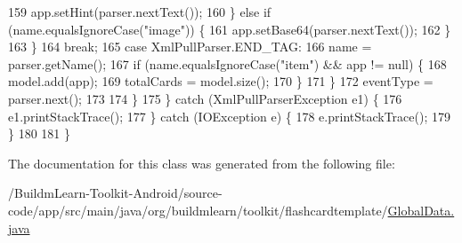 \begin{DoxyCode}
159                                 app.setHint(parser.nextText());
160                             \} \textcolor{keywordflow}{else} \textcolor{keywordflow}{if} (name.equalsIgnoreCase(\textcolor{stringliteral}{"image"})) \{
161                                 app.setBase64(parser.nextText());
162                             \}
163                         \}
164                         \textcolor{keywordflow}{break};
165                     \textcolor{keywordflow}{case} XmlPullParser.END\_TAG:
166                         name = parser.getName();
167                         \textcolor{keywordflow}{if} (name.equalsIgnoreCase(\textcolor{stringliteral}{"item"}) && app != null) \{
168                             model.add(app);
169                             totalCards = model.size();
170                         \}
171                 \}
172                 eventType = parser.next();
173 
174             \}
175         \} \textcolor{keywordflow}{catch} (XmlPullParserException e1) \{
176             e1.printStackTrace();
177         \} \textcolor{keywordflow}{catch} (IOException e) \{
178             e.printStackTrace();
179         \}
180 
181     \}
\end{DoxyCode}


The documentation for this class was generated from the following file\-:\begin{DoxyCompactItemize}
\item 
/\-Buildm\-Learn-\/\-Toolkit-\/\-Android/source-\/code/app/src/main/java/org/buildmlearn/toolkit/flashcardtemplate/\hyperlink{flashcardtemplate_2GlobalData_8java}{Global\-Data.\-java}\end{DoxyCompactItemize}
